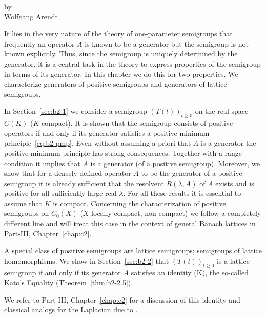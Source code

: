 \label{chap:b2}%
\thispagestyle{empty}
{\Large
\vspace*{-.75cm}
by \\[.25em]
Wolfgang Arendt 
\vspace{.75cm}
\\
}

It lies in the very nature of the theory of one-parameter semigroups that frequently an operator $A$ is known to be a generator but the semigroup is not known explicitly.
Thus, since the semigroup is uniquely determined by the generator, it is a central task in the theory to express properties of the semigroup in terms of its generator.
In this chapter we do this for two properties.
We characterize generators of positive semigroups and generators of lattice semigroups.

In Section~\ref{sec:b2-1} we consider a semigroup $(T(t))_{t \geq 0}$ on the real space $C(K)$ ($K$ compact).
It is shown that the semigroup consists of positive operators if and only if its generator satisfies a positive minimum principle~\eqref{eq:b2-pmp}.
Even without assuming a priori that $A$ is a generator the positive minimum principle has strong consequences.
Together with a range condition it implies that $A$ is a generator (of a positive semigroup).
Moreover, we show that for a densely defined operator $A$ to be the generator of a positive semigroup it is already sufficient that the resolvent $R(\lambda,A)$ of\/ $A$ exists and is positive for all sufficiently large real $\lambda$.
For all these results it is essential to assume that $K$ is compact.
Concerning the characterization of positive semigroups on $C_{0}(X)$ ($X$ locally compact, non-compact) we follow a completely different line and will treat this case in the context of general Banach lattices in Part-III, Chapter~\ref{chap:c2}.

A special class of positive semigroups are lattice semigroups; \ie  semigroups of lattice homomorphisms.
We show in Section~\ref{sec:b2-2} that $(T(t))_{t \geq 0}$ is a lattice semigroup if and only if its generator $A$ satisfies an identity (K), the so-called Kato's Equality (Theorem~\ref{thm:b2-2.5}).

We refer to Part-III, Chapter~\ref{chap:c2} for a discussion of this identity and classical analogs for the Laplacian due to \textcite{kato:1973}.

